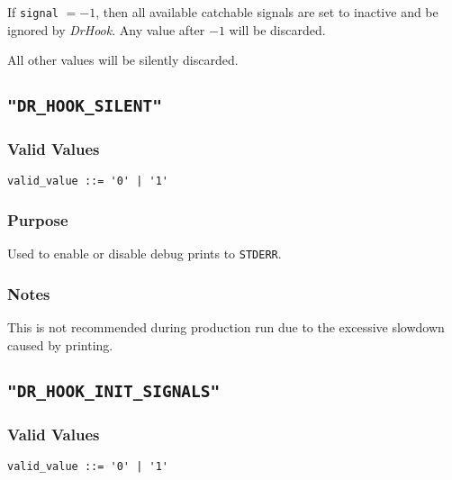 If \verb|signal| $= -1$, then all available catchable signals are set to inactive and be ignored by \textit{DrHook}. Any value after $-1$ will be discarded.

All other values will be silently discarded.



\subsection{\texttt{"DR\_HOOK\_SILENT"}} \label{section:flags:DR_HOOK_SILENT}
\vspace{-2ex}
\subsubsection{Valid Values}
\vspace{-2ex}
\verb+valid_value ::= '0' | '1'+ 

\vspace{-2ex}
\subsubsection{Purpose}
\vspace{-2ex}
Used to enable or disable debug prints to \verb|STDERR|.

\vspace{-2ex}
\subsubsection{Notes}
\vspace{-2ex}
This is not recommended during production run due to the excessive slowdown caused by printing.



\subsection{\texttt{"DR\_HOOK\_INIT\_SIGNALS"}}
\label{section:flags:DR_HOOK_INIT_SIGNALS}
\vspace{-2ex}
\subsubsection{Valid Values}
\vspace{-2ex}
\verb+valid_value ::= '0' | '1'+ 

